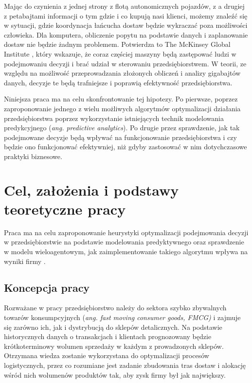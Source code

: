 \documentclass[polish, twoside, 12pt, a4paper]{article}
\theoremstyle{definition}
\theoremstyle{plain}
\theoremstyle{remark}
\begin{document}
Mając do czynienia z jednej strony z flotą autonomicznych pojazdów, z a drugiej z petabajtami informacji o tym gdzie i co kupują nasi klienci, możemy znaleźć się w sytuacji, gdzie koordynacja łańcucha dostaw będzie wykraczać poza możliwości człowieka. Dla komputera, obliczenie popytu na podstawie danych i zaplanowanie dostaw nie będzie żadnym problemem. Potwierdza to The McKinsey Global Institute \cite{McKinsey2011}, który wskazuje, że coraz częściej maszyny będą zastępować ludzi w podejmowaniu decyzji i brać udział w sterowaniu przedsiębiorstwem. W teorii, ze względu na możliwość przeprowadzania złożonych obliczeń i analizy gigabajtów danych, decyzje te będą trafniejsze i poprawią efektywność przedsiębiorstwa. 

Niniejsza praca ma na celu skonfrontowanie tej hipotezy. Po pierwsze, poprzez zaproponowanie jednego z wielu możliwych algorytmów optymalizacji działania przedsiębiorstwa poprzez wykorzystanie istniejących technik modelowania predykcyjnego (\textit{ang. predictive analytics}). Po drugie przez sprawdzenie, jak tak podejmowane decyzje będą wpływać na funkcjonowanie przedsiębiorstwa i czy będzie ono funkcjonować efektywniej, niż gdyby zastosować w nim dotychczasowe praktyki biznesowe.


\clearpage

\section{Cel, założenia i podstawy teoretyczne pracy}

Praca ma na celu zaproponowanie heurystyki optymalizacji podejmowania decyzji w przedsiębiorstwie na podstawie modelowania predyktywnego oraz sprawdzenie w modelu wieloagentowym, jak zaimplementowanie takiego algorytmu wpływa na wyniki firmy .  

\subsection{Koncepcja pracy}

Rozważane w pracy przedsiębiorstwo należy do sektora szybko zbywalnych towarów konsumpcyjnych (\textit{ang. fast moving consumer goods, FMCG)} i zajmuje się zarówno ich, jak i dystrybucją do sklepów detalicznych. Na podstawie historycznych danych o transakcjach i klientach prognozowany będzie krótkoterminowy wolumen sprzedaży w każdym z prowadzonych sklepów. Otrzymana wiedza zostanie wykorzystana do optymalizacji procesów logistycznych, przez co rozumiane jest zadanie zbudowania tras dostaw i alokację wśród nich wolumenów produktów tak, aby zysk firmy był jak największy. 
\end{document}
